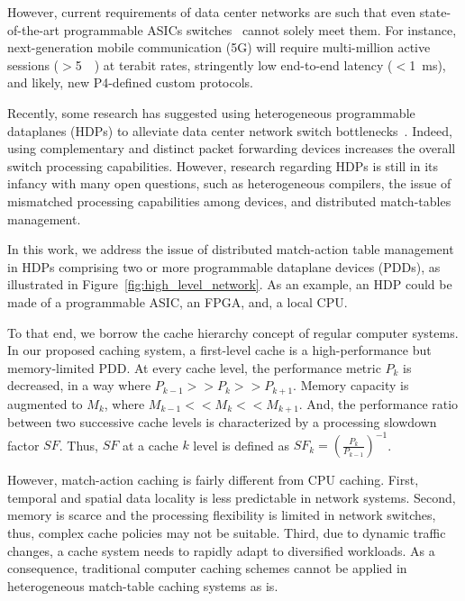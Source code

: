 However, current requirements of data center networks are such that even state-of-the-art programmable ASICs switches~\cite{tofino:18} cannot solely meet them.
For instance, next-generation mobile communication (5G) will require multi-million active sessions ($>$\SI{5}{\mega\nothing}) at terabit rates, stringently low end-to-end latency ($<$\SI{1}{\milli\second}), and likely, new P4-defined custom protocols.

Recently, some research has suggested using heterogeneous programmable dataplanes (HDPs) to alleviate data center network switch bottlenecks~\cite{p4eu:18}.
Indeed, using complementary and distinct packet forwarding devices increases the overall switch processing capabilities.
However, research regarding HDPs is still in its infancy with many open questions, such as heterogeneous compilers, the issue of mismatched processing capabilities among devices, and distributed match-tables management.

In this work, we address the issue of distributed match-action table management in HDPs comprising two or more programmable dataplane devices (PDDs), as illustrated in Figure~\ref{fig:high_level_network}.
As an example, an HDP could be made of a programmable ASIC, an  FPGA, and, a local CPU.


To that end, we borrow the cache hierarchy concept of regular computer systems.
In our proposed caching system, a first-level cache is a high-performance but memory-limited PDD. At every cache level, the performance metric $P_{k}$ is decreased, in a way where $P_{k-1} >> P_{k} >> P_{k+1}$. Memory capacity is augmented to $M_{k}$, where $M_{k-1} << M_{k} << M_{k+1}$. And, the performance ratio between two successive cache levels is characterized by a processing slowdown factor $SF$. Thus, $SF$ at a cache $k$ level is defined as $SF_{k} = \left(\frac{P_{k}}{P_{k-1}}\right)^{-1}$.


However, match-action caching is fairly different from CPU caching.
First, temporal and spatial data locality is less predictable in network systems.
Second, memory is scarce and the processing flexibility is limited in network switches, thus, complex cache policies may not be suitable.
Third, due to dynamic traffic changes, a cache system needs to rapidly adapt to diversified workloads.
As a consequence, traditional computer caching schemes cannot be applied in heterogeneous match-table caching systems as is.

